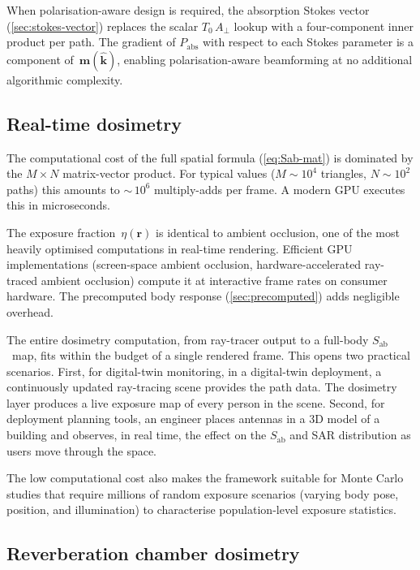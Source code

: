 \documentclass[11pt,a4paper]{article}
\theoremstyle{definition}      %
\newcommand{\khat}{\hat{\bm{k}}}
\newcommand{\rr}{\mathbf{r}}
\newcommand{\Sab}{S_{\mathrm{ab}}}
\newcommand{\Aperp}{A_{\perp}}
\begin{document}
When polarisation-aware design is required, the absorption Stokes
vector (\cref{sec:stokes-vector}) replaces the scalar $T_0\,\Aperp$
lookup with a four-component inner product per path.  The gradient of
$P_{\mathrm{abs}}$ with respect to each Stokes parameter is a
component of~$\mathbf{m}(\khat)$, enabling polarisation-aware
beamforming at no additional algorithmic complexity.

\subsection{Real-time dosimetry}\label{sec:app-realtime}

The computational cost of the full spatial formula
(\cref{eq:Sab-mat}) is dominated by the $M\times N$ matrix-vector
product.  For typical values ($M\sim 10^4$ triangles, $N\sim 10^2$
paths) this amounts to ${\sim}\,10^6$ multiply-adds per frame.  A
modern GPU executes this in microseconds.

The exposure fraction~$\eta(\rr)$ is identical to ambient occlusion,
one of the most heavily optimised computations in real-time rendering.
Efficient GPU implementations (screen-space ambient occlusion,
hardware-accelerated ray-traced ambient occlusion) compute it at
interactive frame rates on consumer hardware.  The precomputed body
response (\cref{sec:precomputed}) adds negligible overhead.

The entire dosimetry computation, from ray-tracer
output to a full-body $\Sab$~map, fits within the budget of a single
rendered frame.  This opens two practical scenarios.
First, for digital-twin monitoring, in a digital-twin
deployment, a continuously updated ray-tracing scene provides the
path data.  The dosimetry layer produces a live exposure map of
every person in the scene.
Second, for deployment planning tools, an engineer places
antennas in a 3D model of a building and observes, in real time,
the effect on the $\Sab$ and SAR distribution as users move through the
space.

The low computational cost also makes the framework suitable for
Monte Carlo studies that require millions of random exposure
scenarios (varying body pose, position, and illumination) to
characterise population-level exposure statistics.

\subsection{Reverberation chamber dosimetry}\label{sec:app-reverb}
\end{document}

